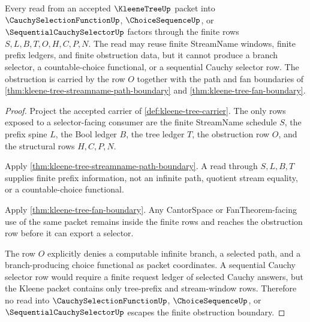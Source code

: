 \begin{theorem}
\label{thm:kleene-tree-selector-refusal}
Every read from an accepted $\KleeneTreeUp$ packet into $\CauchySelectionFunctionUp$, $\ChoiceSequenceUp$, or $\SequentialCauchySelectorUp$ factors through the finite rows $S,L,B,T,O,H,C,P,N$. The read may reuse finite StreamName windows, finite prefix ledgers, and finite obstruction data, but it cannot produce a branch selector, a countable-choice functional, or a sequential Cauchy selector row. The obstruction is carried by the row $O$ together with the path and fan boundaries of \autoref{thm:kleene-tree-streamname-path-boundary} and \autoref{thm:kleene-tree-fan-boundary}.
\end{theorem}
\begin{proof}
Project the accepted carrier of \autoref{def:kleene-tree-carrier}. The only rows exposed to a selector-facing consumer are the finite StreamName schedule $S$, the prefix spine $L$, the Bool ledger $B$, the tree ledger $T$, the obstruction row $O$, and the structural rows $H,C,P,N$.

Apply \autoref{thm:kleene-tree-streamname-path-boundary}. A read through $S,L,B,T$ supplies finite prefix information, not an infinite path, quotient stream equality, or a countable-choice functional.

Apply \autoref{thm:kleene-tree-fan-boundary}. Any CantorSpace or FanTheorem-facing use of the same packet remains inside the finite rows and reaches the obstruction row before it can export a selector.

The row $O$ explicitly denies a computable infinite branch, a selected path, and a branch-producing choice functional as packet coordinates. A sequential Cauchy selector row would require a finite request ledger of selected Cauchy answers, but the Kleene packet contains only tree-prefix and stream-window rows. Therefore no read into $\CauchySelectionFunctionUp$, $\ChoiceSequenceUp$, or $\SequentialCauchySelectorUp$ escapes the finite obstruction boundary.
\end{proof}

